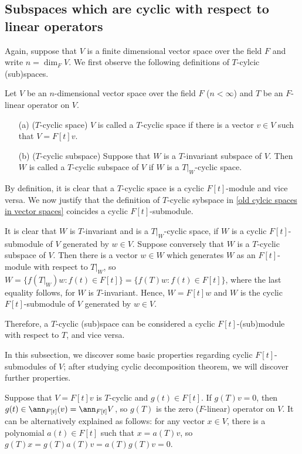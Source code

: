 \subsection{Subspaces which are cyclic with respect to linear operators}

Again, suppose that  $V$ is a finite dimensional vector space over the field $F$ and write $n=\dim_F V$.
We first observe the following definitions of $T$-cylcic (sub)spaces.
\begin{defi}\label{old cylcic spaces in vector spaces}
    Let $V$ be an $n$-dimensional vector space over the field $F$ ($n<\infty$) and $T$ be an $F$-linear operator on $V$.
    \begin{enumerate}
        \item[(a)]
        {
            ($T$-cyclic space)
            $V$ is called a $T$-cyclic space if there is a vector $v\in V$ such that $V=F[t]v$.
        }
        \item[(b)]
        {
            ($T$-cyclic subspace)
            Suppose that $W$ is a $T$-invariant subspace of $V$.
            Then $W$ is called a $T$-cyclic subspace of $V$ if $W$ is a $T|_W$-cyclic space.
        }
    \end{enumerate}
\end{defi}
\begin{obs}
    By definition, it is clear that a $T$-cyclic space is a cyclic $F[t]$-module and vice versa.
    We now justify that the definition of $T$-cyclic sybspace in \cref{old cylcic spaces in vector spaces} coincides a cyclic $F[t]$-submodule.

    It is clear that $W$ is $T$-invariant and is a $T|_W$-cyclic space, if $W$ is a cyclic $F[t]$-submodule of $V$ generated by $w\in V$.
    Suppose conversely that $W$ is a $T$-cyclic subspace of $V$.
    Then there is a vector $w\in W$ which generates $W$ as an $F[t]$-module with respect to $T|_W$, so $W=\{f(T|_W)w: f(t)\in F[t]\}=\{f(T)w: f(t)\in F[t]\}$, where the last equality follows, for $W$ is $T$-invariant.
    Hence, $W=F[t]w$ and $W$ is the cyclic $F[t]$-submodule of $V$ generated by $w\in V$.

    Therefore, a $T$-cyclic (sub)space can be considered a cyclic $F[t]$-(sub)module with respect to $T$, and vice versa.
\end{obs}

In this subsection, we discover some basic properties regarding cyclic $F[t]$-submodules of $V$; after studying cyclic decomposition theorem, we will discover further properties.
\begin{exmp}
    Suppose that $V=F[t]v$ is $T$-cyclic and $g(t)\in F[t]$.
    If $g(T)v=0$, then $g(t)\in\ann_{F[t]}(v)=\ann_{F[t]} V$, so $g(T)$ is the zero ($F$-linear) operator on $V$.
    It can be alternatively explained as follows: for any vector $x\in V$, there is a polynomial $a(t)\in F[t]$ such that $x=a(T)v$, so $g(T)x=g(T)a(T)v=a(T)g(T)v=0$.
\end{exmp}

